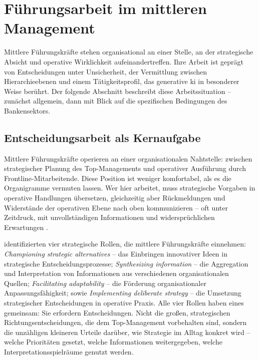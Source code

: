 \section{Führungsarbeit im mittleren Management}
\label{sec:fuehrung}

Mittlere Führungskräfte stehen organisational an einer Stelle, an der strategische Absicht und operative Wirklichkeit aufeinandertreffen. Ihre Arbeit ist geprägt von Entscheidungen unter Unsicherheit, der Vermittlung zwischen Hierarchieebenen und einem Tätigkeitsprofil, das generative \gls{ki} in besonderer Weise berührt. Der folgende Abschnitt beschreibt diese Arbeitssituation -- zunächst allgemein, dann mit Blick auf die spezifischen Bedingungen des Bankensektors.

\subsection{Entscheidungsarbeit als Kernaufgabe}

Mittlere Führungskräfte operieren an einer organisationalen Nahtstelle: zwischen strategischer Planung des Top-Managements und operativer Ausführung durch Frontline-Mitarbeitende. Diese Position ist weniger komfortabel, als es die Organigramme vermuten lassen. Wer hier arbeitet, muss strategische Vorgaben in operative Handlungen übersetzen, gleichzeitig aber Rückmeldungen und Widerstände der operativen Ebene nach oben kommunizieren -- oft unter Zeitdruck, mit unvollständigen Informationen und widersprüchlichen Erwartungen \parencite{floydManagingStrategicConsensus1997}.

\textcite{floydManagingStrategicConsensus1997} identifizierten vier strategische Rollen, die mittlere Führungskräfte einnehmen: \textit{Championing strategic alternatives} -- das Einbringen innovativer Ideen in strategische Entscheidungsprozesse; \textit{Synthesizing information} -- die Aggregation und Interpretation von Informationen aus verschiedenen organisationalen Quellen; \textit{Facilitating adaptability} -- die Förderung organisationaler Anpassungsfähigkeit; sowie \textit{Implementing deliberate strategy} -- die Umsetzung strategischer Entscheidungen in operative Praxis. Alle vier Rollen haben eines gemeinsam: Sie erfordern Entscheidungen. Nicht die großen, strategischen Richtungsentscheidungen, die dem Top-Management vorbehalten sind, sondern die unzähligen kleineren Urteile darüber, wie Strategie im Alltag konkret wird -- welche Prioritäten gesetzt, welche Informationen weitergegeben, welche Interpretationsspielräume genutzt werden.

